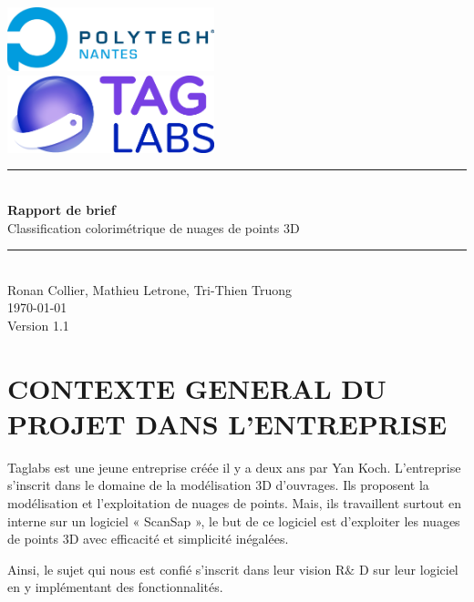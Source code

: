 \documentclass[12pt,titlepage]{report}
\begin{document}
\renewcommand{\thesection}{\arabic{section}} %

\begin{titlepage}
\newcommand{\HRule}{\rule{\linewidth}{0.5mm}}
\center

	\includegraphics[width=0.45\textwidth]{./image2.png}\\[1cm]
   
	\includegraphics[width=0.45\textwidth]{./image1.png}


\HRule \\[0.4cm]
{ \huge \bfseries Rapport de brief \\[0.15cm] }
Classification colorimétrique de nuages de points 3D
\HRule \\[1.5cm]
Ronan Collier,
Mathieu Letrone,
Tri-Thien Truong
\\[1cm]
\today \\ [1cm]
Version 1.1
\end{titlepage}


\section{CONTEXTE GENERAL DU PROJET DANS L’ENTREPRISE}

\begin{justify}
Taglabs est une jeune entreprise créée il y a deux ans par Yan Koch. L’entreprise s’inscrit dans le domaine de la modélisation 3D d’ouvrages. Ils proposent la modélisation et l’exploitation de nuages de points. Mais, ils travaillent surtout en interne sur un logiciel « ScanSap », le but de ce logiciel est d’exploiter les nuages de points 3D avec efficacité et simplicité inégalées.
\end{justify}\par

\begin{justify}
Ainsi, le sujet qui nous est confié s’inscrit dans leur vision R$\&$ D sur leur logiciel en y implémentant des fonctionnalités.
\end{justify}\par
\end{document}
